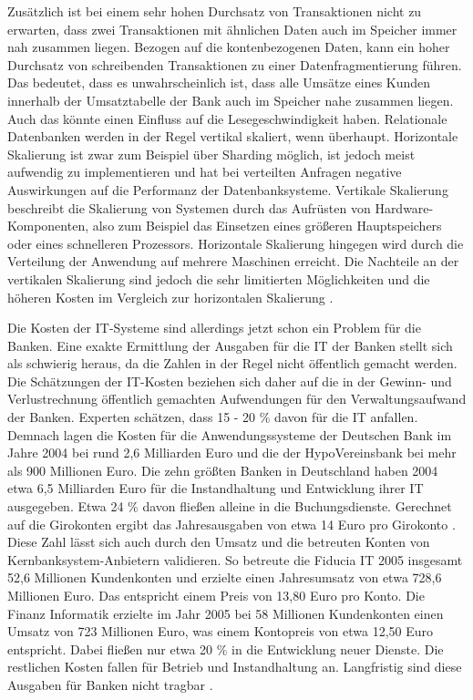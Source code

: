 \documentclass[12pt,oneside,a4paper,parskip]{scrbook}
\begin{document}
Zusätzlich ist bei einem sehr hohen Durchsatz von Transaktionen nicht zu erwarten, dass zwei Transaktionen mit ähnlichen Daten auch im Speicher immer nah zusammen liegen. Bezogen auf die kontenbezogenen Daten, kann ein hoher Durchsatz von schreibenden Transaktionen zu einer Datenfragmentierung führen. Das bedeutet, dass es unwahrscheinlich ist, dass alle Umsätze eines Kunden innerhalb der Umsatztabelle der Bank auch im Speicher nahe zusammen liegen. Auch das könnte einen Einfluss auf die Lesegeschwindigkeit haben. Relationale Datenbanken werden in der Regel vertikal skaliert, wenn überhaupt. Horizontale Skalierung ist zwar zum Beispiel über Sharding möglich, ist jedoch meist aufwendig zu implementieren und hat bei verteilten Anfragen negative Auswirkungen auf die Performanz der Datenbanksysteme. Vertikale Skalierung beschreibt die Skalierung von Systemen durch das Aufrüsten von Hardware-Komponenten, also zum Beispiel das Einsetzen eines größeren Hauptspeichers oder eines schnelleren Prozessors. Horizontale Skalierung hingegen wird durch die Verteilung der Anwendung auf mehrere Maschinen erreicht. Die Nachteile an der vertikalen Skalierung sind jedoch die sehr limitierten Möglichkeiten und die höheren Kosten im Vergleich zur horizontalen Skalierung \cite{sharding}\cite{rdbmssuck}. 

Die Kosten der IT-Systeme sind allerdings jetzt schon ein Problem für die Banken. Eine exakte Ermittlung der Ausgaben für die IT der Banken stellt sich als schwierig heraus, da die Zahlen in der Regel nicht öffentlich gemacht werden. Die Schätzungen der IT-Kosten beziehen sich daher auf die in der Gewinn- und Verlustrechnung öffentlich gemachten Aufwendungen für den Verwaltungsaufwand der Banken. Experten schätzen, dass 15 - 20 \% davon für die IT anfallen. Demnach lagen die Kosten für die Anwendungssysteme der Deutschen Bank im Jahre 2004 bei rund 2,6 Milliarden Euro und die der HypoVereinsbank bei mehr als 900 Millionen Euro. Die zehn größten Banken in Deutschland haben 2004 etwa 6,5 Milliarden Euro für die Instandhaltung und Entwicklung ihrer IT ausgegeben. 
Etwa 24 \% davon fließen alleine in die Buchungsdienste. Gerechnet auf die Girokonten ergibt das Jahresausgaben von etwa 14 Euro pro Girokonto \cite[29-39]{ITidF}. Diese Zahl lässt sich auch durch den Umsatz und die betreuten Konten von Kernbanksystem-Anbietern validieren. So betreute die Fiducia IT 2005 insgesamt 52,6 Millionen Kundenkonten und erzielte einen Jahresumsatz von etwa 728,6 Millionen Euro. Das entspricht einem Preis von 13,80 Euro pro Konto. Die Finanz Informatik erzielte im Jahr 2005 bei 58 Millionen Kundenkonten einen Umsatz von 723 Millionen Euro, was einem Kontopreis von etwa 12,50 Euro entspricht. Dabei fließen nur etwa 20 \% in die Entwicklung neuer Dienste. Die restlichen Kosten fallen für Betrieb und Instandhaltung an. Langfristig sind diese Ausgaben für Banken nicht tragbar \cite[75-91]{ITidF}\cite{SuPdIiB}\cite[41-42]{DdF}\cite{bankingsCosts}. 
\end{document}
